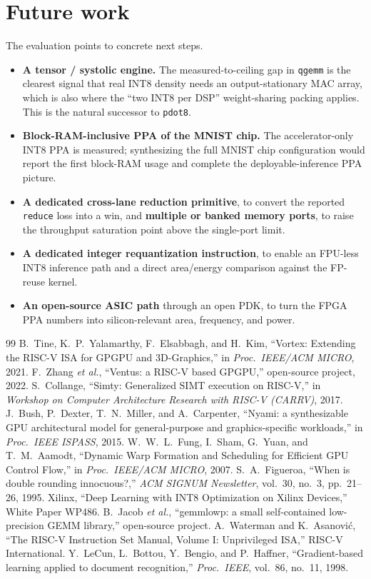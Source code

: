 \documentclass[12pt,a4paper,oneside]{report}
\newcommand{\code}[1]{\texttt{#1}}
\begin{document}
\section{Future work}
The evaluation points to concrete next steps.
\begin{itemize}
\item \textbf{A tensor / systolic engine.} The measured-to-ceiling gap in
\code{qgemm} is the clearest signal that real INT8 density needs an
output-stationary MAC array, which is also where the ``two INT8 per DSP''
weight-sharing packing applies. This is the natural successor to \code{pdot8}.
\item \textbf{Block-RAM-inclusive PPA of the MNIST chip.} The accelerator-only INT8
PPA is measured; synthesizing the full MNIST chip configuration would report the
first block-RAM usage and complete the deployable-inference PPA picture.
\item \textbf{A dedicated cross-lane reduction primitive}, to convert the reported
\code{reduce} loss into a win, and \textbf{multiple or banked memory ports}, to
raise the throughput saturation point above the single-port limit.
\item \textbf{A dedicated integer requantization instruction}, to enable an
FPU-less INT8 inference path and a direct area/energy comparison against the
FP-reuse kernel.
\item \textbf{An open-source ASIC path} through an open PDK, to turn the FPGA PPA
numbers into silicon-relevant area, frequency, and power.
\end{itemize}

\begin{thebibliography}{99}
 B.~Tine, K.~P.~Yalamarthy, F.~Elsabbagh, and H.~Kim, ``Vortex:
Extending the RISC-V ISA for GPGPU and 3D-Graphics,'' in \emph{Proc.\ IEEE/ACM
MICRO}, 2021.
 F.~Zhang \emph{et al.}, ``Ventus: a RISC-V based GPGPU,''
open-source project, 2022.
 S.~Collange, ``Simty: Generalized SIMT execution on RISC-V,'' in
\emph{Workshop on Computer Architecture Research with RISC-V (CARRV)}, 2017.
 J.~Bush, P.~Dexter, T.~N.~Miller, and A.~Carpenter, ``Nyami: a
synthesizable GPU architectural model for general-purpose and graphics-specific
workloads,'' in \emph{Proc.\ IEEE ISPASS}, 2015.
 W.~W.~L.~Fung, I.~Sham, G.~Yuan, and T.~M.~Aamodt, ``Dynamic Warp
Formation and Scheduling for Efficient GPU Control Flow,'' in \emph{Proc.\ IEEE/ACM
MICRO}, 2007.
 S.~A.~Figueroa, ``When is double rounding innocuous?,''
\emph{ACM SIGNUM Newsletter}, vol.~30, no.~3, pp.~21--26, 1995.
 Xilinx, ``Deep Learning with INT8 Optimization on Xilinx
Devices,'' White Paper WP486.
 B.~Jacob \emph{et al.}, ``gemmlowp: a small self-contained
low-precision GEMM library,'' open-source project.
 A.~Waterman and K.~Asanovi\'c, ``The RISC-V Instruction Set
Manual, Volume I: Unprivileged ISA,'' RISC-V International.
 Y.~LeCun, L.~Bottou, Y.~Bengio, and P.~Haffner, ``Gradient-based
learning applied to document recognition,'' \emph{Proc.\ IEEE}, vol.~86, no.~11,
1998.
\end{thebibliography}
\end{document}
